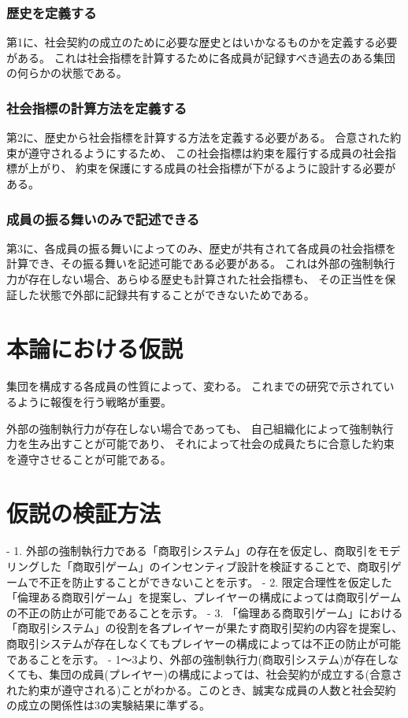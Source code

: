 \documentclass[a4j]{ujreport}
\begin{document}
\subsection{歴史を定義する}
第1に、社会契約の成立のために必要な歴史とはいかなるものかを定義する必要がある。
これは社会指標を計算するために各成員が記録すべき過去のある集団の何らかの状態である。


\subsection{社会指標の計算方法を定義する}
第2に、歴史から社会指標を計算する方法を定義する必要がある。
合意された約束が遵守されるようにするため、
この社会指標は約束を履行する成員の社会指標が上がり、
約束を保護にする成員の社会指標が下がるように設計する必要がある。


\subsection{成員の振る舞いのみで記述できる}
第3に、各成員の振る舞いによってのみ、歴史が共有されて各成員の社会指標を計算でき、その振る舞いを記述可能である必要がある。
これは外部の強制執行力が存在しない場合、あらゆる歴史も計算された社会指標も、
その正当性を保証した状態で外部に記録共有することができないためである。


\chapter{本論における仮説}
集団を構成する各成員の性質によって、変わる。
これまでの研究で示されているように報復を行う戦略が重要。

外部の強制執行力が存在しない場合であっても、
自己組織化によって強制執行力を生み出すことが可能であり、
それによって社会の成員たちに合意した約束を遵守させることが可能である。


\chapter{仮説の検証方法}
- 1. 外部の強制執行力である「商取引システム」の存在を仮定し、商取引をモデリングした「商取引ゲーム」のインセンティブ設計を検証することで、商取引ゲームで不正を防止することができないことを示す。
- 2. 限定合理性を仮定した「倫理ある商取引ゲーム」を提案し、プレイヤーの構成によっては商取引ゲームの不正の防止が可能であることを示す。
- 3. 「倫理ある商取引ゲーム」における「商取引システム」の役割を各プレイヤーが果たす商取引契約の内容を提案し、商取引システムが存在しなくてもプレイヤーの構成によっては不正の防止が可能であることを示す。
- 1〜3より、外部の強制執行力(商取引システム)が存在しなくても、集団の成員(プレイヤー)の構成によっては、社会契約が成立する(合意された約束が遵守される)ことがわかる。このとき、誠実な成員の人数と社会契約の成立の関係性は3の実験結果に準ずる。
\end{document}

